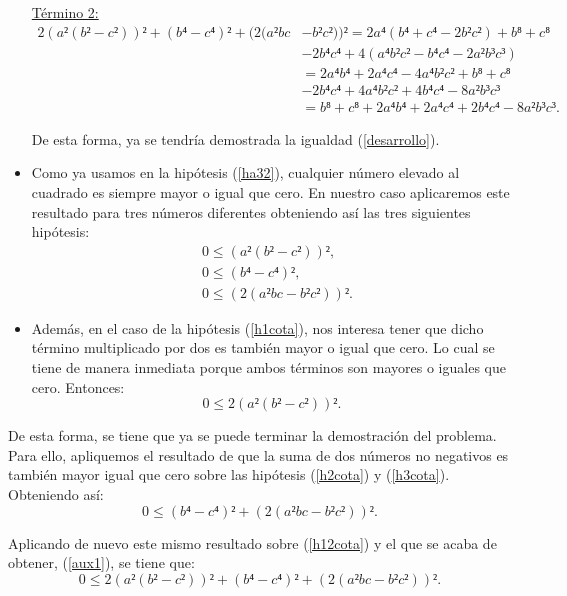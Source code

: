 \begin{demostracion}
\begin{itemize}
    \underline{Término 2:}
    \begin{align*}
      2(a²(b²-c²))²+(b⁴-c⁴)²+(2(a²bc&-b²c²))²=2a⁴(b⁴+c⁴-2b²c²)+b⁸+c⁸\\
                                         &-2b⁴c⁴+4(a⁴b²c²-b⁴c⁴-2a²b³c³)\\
                                         &=2a⁴b⁴+2a⁴c⁴-4a⁴b²c²+b⁸+c⁸\\
                                         &-2b⁴c⁴+4a⁴b²c²+4b⁴c⁴-8a²b³c³\\
                                    &=b⁸+c⁸+2a⁴b⁴+2a⁴c⁴+2b⁴c⁴-8a²b³c³.
    \end{align*}

    De esta forma, ya se tendría demostrada la igualdad (\ref{desarrollo}).

  \item Como ya usamos en la hipótesis (\ref{ha32}), cualquier número
    elevado al cuadrado es siempre mayor o igual que cero. En nuestro caso
    aplicaremos este resultado para tres números diferentes obteniendo
    así las tres siguientes hipótesis:
    \begin{align}
      &0≤(a²(b²-c²))²,\label{h1cota}\tag{h1}\\ 
      &0≤(b⁴-c⁴)², \label{h2cota}\tag{h2}\\
      &0≤(2(a²bc-b²c²))².\label{h3cota}\tag{h3}
    \end{align}

  \item Además, en el caso de la hipótesis (\ref{h1cota}), nos interesa
    tener que dicho término multiplicado por dos es también mayor o igual
    que cero. Lo cual se tiene de manera inmediata porque ambos términos
    son mayores o iguales que cero. Entonces:
    \begin{equation}
      0≤2(a²(b²-c²))².\label{h12cota}\tag{h1'}
    \end{equation}                      
  \end{itemize}

  De esta forma, se tiene que ya se puede terminar la demostración del
  problema. Para ello, apliquemos el resultado de que la suma de dos
  números no negativos es también mayor igual que cero sobre las hipótesis
  (\ref{h2cota}) y (\ref{h3cota}). Obteniendo así:
  \begin{equation}\label{aux1}\tag{aux1}
    0≤(b⁴-c⁴)²+(2(a²bc-b²c²))².
  \end{equation}

  Aplicando de nuevo este mismo resultado sobre (\ref{h12cota}) y el que
  se acaba de obtener, (\ref{aux1}), se tiene que:
  \begin{equation}\label{tesis}\tag{tesis}
    0≤2(a²(b²-c²))²+(b⁴-c⁴)²+(2(a²bc-b²c²))².
  \end{equation}


\end{demostracion}

